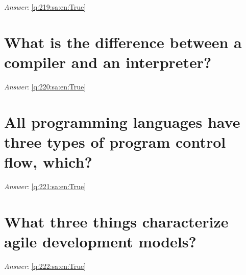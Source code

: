 \documentclass[a4paper,11pt,oneside]{book}
\begin{document}
\begin{sloppypar}
\label{q:219:sa:en:False}

\vspace{2cm}

\noindent\makebox[\textwidth]{\hrulefill}

\vspace{1cm}

\textit{Answer}: \autoref{q:219:sa:en:True}



\section{What is the difference between a compiler and an interpreter?}

\label{q:220:sa:en:False}

\vspace{2cm}

\noindent\makebox[\textwidth]{\hrulefill}

\vspace{1cm}

\textit{Answer}: \autoref{q:220:sa:en:True}



\section{All programming languages have three types of program control flow, which?}

\label{q:221:sa:en:False}

\vspace{2cm}

\noindent\makebox[\textwidth]{\hrulefill}

\vspace{1cm}

\textit{Answer}: \autoref{q:221:sa:en:True}



\section{What three things characterize agile development models?}

\label{q:222:sa:en:False}

\vspace{2cm}

\noindent\makebox[\textwidth]{\hrulefill}

\vspace{1cm}

\textit{Answer}: \autoref{q:222:sa:en:True}




\end{sloppypar}
\end{document}
